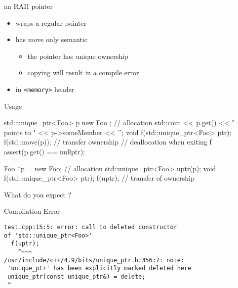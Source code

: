 \begin{frame}[fragile]
  \begin{block}{an RAII pointer}
    \begin{itemize}
    \item wraps a regular pointer
    \item has move only semantic
      \begin{itemize}
      \item the pointer has unique ownership
      \item copying will result in a compile error
      \end{itemize}
    \item in \texttt{<memory>} header
    \end{itemize}
  \end{block}
  \pause
  \begin{exampleblock}{Usage}
    \begin{cppcode*}{}
      std::unique_ptr<Foo> p{ new Foo{} }; // allocation
      std::cout << p.get() << " points to "
                << p->someMember << '\n';
      void f(std::unique_ptr<Foo> ptr);
      f(std::move(p)); // transfer ownership
      // deallocation when exiting f
      assert(p.get() == nullptr);
    \end{cppcode*}
  \end{exampleblock}
\end{frame}

\begin{frame}[fragile]
  \begin{exampleblock}{}
    \begin{cppcode*}{}
      Foo *p = new Foo{};  // allocation
      std::unique_ptr<Foo> uptr(p);
      void f(std::unique_ptr<Foo> ptr);
      f(uptr); // transfer of ownership
    \end{cppcode*}
    What do you expect ?
  \end{exampleblock}
  \pause
  \begin{alertblock}{Compilation Error - }
    \begin{verbatim}
test.cpp:15:5: error: call to deleted constructor
of 'std::unique_ptr<Foo>'
  f(uptr);
    ^~~~
/usr/include/c++/4.9/bits/unique_ptr.h:356:7: note:
 'unique_ptr' has been explicitly marked deleted here
 unique_ptr(const unique_ptr&) = delete;
 ^
    \end{verbatim}
  \end{alertblock}
\end{frame}

